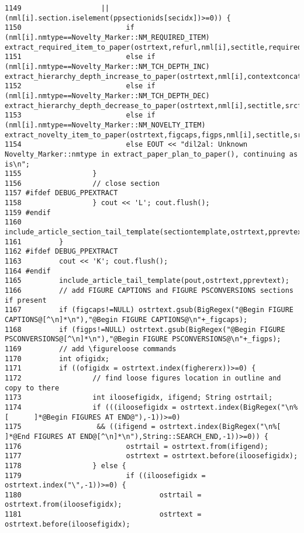 \begin{verbatim}
1149                   || (nml[i].section.iselement(ppsectionids[secidx])>=0)) {
1150                         if (nml[i].nmtype==Novelty_Marker::NM_REQUIRED_ITEM) extract_required_item_to_paper(ostrtext,refurl,nml[i],sectitle,requireditems,pprevtext);
1151                         else if (nml[i].nmtype==Novelty_Marker::NM_TCH_DEPTH_INC) extract_hierarchy_depth_increase_to_paper(ostrtext,nml[i],contextconcats,ccranks,sectitle,srcf,srcfname,srcfnum,pprevtext);
1152                         else if (nml[i].nmtype==Novelty_Marker::NM_TCH_DEPTH_DEC) extract_hierarchy_depth_decrease_to_paper(ostrtext,nml[i],sectitle,srcf,srcfname,srcfnum,pprevtext);
1153                         else if (nml[i].nmtype==Novelty_Marker::NM_NOVELTY_ITEM) extract_novelty_item_to_paper(ostrtext,figcaps,figps,nml[i],sectitle,srcf,srcfname,srcfnum,pout,pprevtext);
1154                         else EOUT << "dil2al: Unknown Novelty_Marker::nmtype in extract_paper_plan_to_paper(), continuing as is\n";
1155                 }
1156                 // close section
1157 #ifdef DEBUG_PPEXTRACT
1158                 } cout << 'L'; cout.flush();
1159 #endif
1160                 include_article_section_tail_template(sectiontemplate,ostrtext,pprevtext);
1161         }
1162 #ifdef DEBUG_PPEXTRACT
1163         cout << 'K'; cout.flush();
1164 #endif
1165         include_article_tail_template(pout,ostrtext,pprevtext);
1166         // add FIGURE CAPTIONS and FIGURE PSCONVERSIONS sections if present
1167         if (figcaps!=NULL) ostrtext.gsub(BigRegex("@Begin FIGURE CAPTIONS@[^\n]*\n"),"@Begin FIGURE CAPTIONS@\n"+_figcaps);
1168         if (figps!=NULL) ostrtext.gsub(BigRegex("@Begin FIGURE PSCONVERSIONS@[^\n]*\n"),"@Begin FIGURE PSCONVERSIONS@\n"+_figps);
1169         // add \figureloose commands
1170         int ofigidx;
1171         if ((ofigidx = ostrtext.index(fighererx))>=0) {
1172                 // find loose figures location in outline and copy to there
1173                 int iloosefigidx, ifigend; String ostrtail;
1174                 if (((iloosefigidx = ostrtext.index(BigRegex("\n%[      ]*@Begin FIGURES AT END@"),-1))>=0)
1175                  && ((ifigend = ostrtext.index(BigRegex("\n%[   ]*@End FIGURES AT END@[^\n]*\n"),String::SEARCH_END,-1))>=0)) {
1176                         ostrtail = ostrtext.from(ifigend);
1177                         ostrtext = ostrtext.before(iloosefigidx);
1178                 } else {
1179                         if ((iloosefigidx = ostrtext.index("\",-1))>=0) {
1180                                 ostrtail = ostrtext.from(iloosefigidx);
1181                                 ostrtext = ostrtext.before(iloosefigidx);

\end{verbatim}
